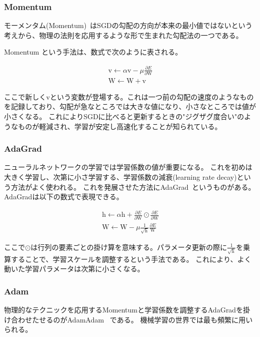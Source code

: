 \subsubsection{Momentum}

モーメンタム(Momentum)~\cite{momentum}はSGDの勾配の方向が本来の最小値ではないという考えから、物理の法則を応用するような形で生まれた勾配法の一つである。


Momentum という手法は、数式で次のように表される。

\begin{eqnarray}
    \mathrm{v} \leftarrow \alpha \mathrm{v} - \mu \frac {\partial E }{\partial \mathrm{W}} \\
    \mathrm{W} \leftarrow \mathrm{W+v}
\label{eq:norm uneq}
\end{eqnarray}

ここで新しく$ \mathrm{v} $という変数が登場する。これは一つ前の勾配の速度のようなものを記録しており、勾配が急なところでは大きな値になり、小さなところでは値が小さくなる。
これによりSGDに比べると更新するときの"ジグザグ度合い"のようなものが軽減され、学習が安定し高速化することが知られている。


\subsubsection{AdaGrad}

ニューラルネットワークの学習では学習係数の値が重要になる。
これを初めは大きく学習し、次第に小さ学習する、学習係数の減衰(learning rate decay)という方法がよく使われる。
これを発展させた方法にAdaGrad~\cite{momentum}というものがある。
AdaGradは以下の数式で表現できる。

\begin{eqnarray}　
    \mathrm{h} \leftarrow \alpha \mathrm{h} + \frac {\partial E }{\partial \mathrm{W}} \odot \frac {\partial E }{\partial \mathrm{W}}  \\
    \mathrm{W} \leftarrow \mathrm{W}  - \mu \frac{ 1 }{\sqrt{\mathrm{h}}} \frac{ \partial E }{\mathrm{W}} 
\label{eq:norm uneq}
\end{eqnarray}

ここで$ \odot $は行列の要素ごとの掛け算を意味する。パラメータ更新の際に$ \frac{ 1 }{\sqrt{\mathrm{h}}} $を乗算することで、学習スケールを調整するという手法である。
これにより、よく動いた学習パラメータは次第に小さくなる。



\subsubsection{Adam}
物理的なテクニックを応用するMomentumと学習係数を調整するAdaGradを掛け合わせたせるのがAdamAdam~\cite{adam} である。
機械学習の世界では最も頻繁に用いられる。




